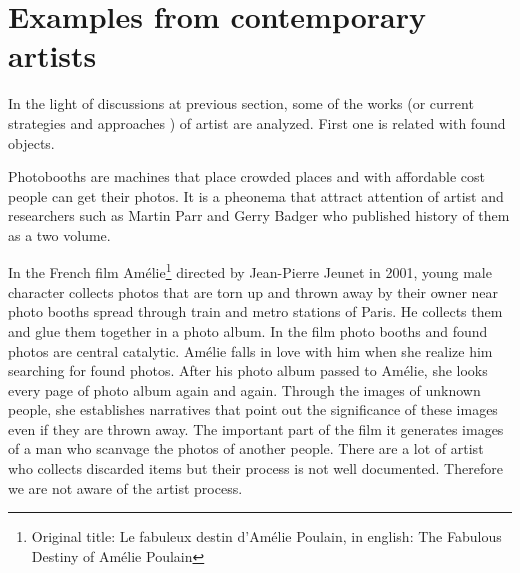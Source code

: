 





%
%
\section{Examples from contemporary artists}
In the light of discussions at previous section, some of the works (or current strategies and approaches ) of artist are analyzed. First one is related with found objects.



Photobooths are machines that place crowded places and with affordable cost people can get their photos. It is a pheonema that attract attention of artist and researchers such as Martin Parr and Gerry Badger who published history of them as a two volume.

In the French film Amélie\footnote{Original title: Le fabuleux destin d'Amélie Poulain, in english: The Fabulous Destiny of Amélie Poulain} directed by Jean-Pierre Jeunet in 2001, young male character collects photos that are torn up and thrown away by their owner near photo booths spread through train and metro stations of Paris. He collects them and glue them together in a photo album. In the film photo booths and found photos are central catalytic. Amélie falls in love with him when she realize him searching for found photos. After his photo album passed to Amélie, she looks every page of photo album again and again. Through the images of unknown people, she establishes narratives that point out the significance of these images even if they are thrown away. The important part of the film it generates images of a man who scanvage the photos of another people. There are a lot of artist who collects discarded items but their process is not well documented. Therefore we are not aware of the artist process. 

